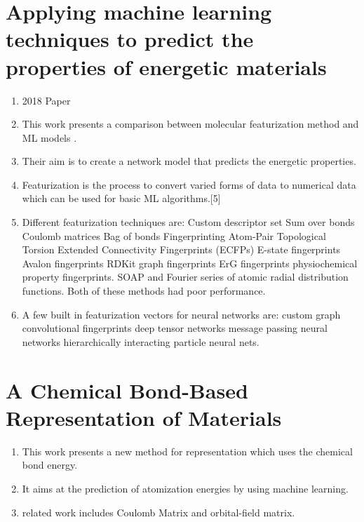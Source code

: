 \documentclass[]{report}
\begin{document}
\section{Applying machine learning
techniques to predict the properties
of energetic materials}
\begin{enumerate}
    \item 2018 Paper
    \item This work presents a comparison between molecular featurization method and ML models . 
    \item Their aim is to create a network model that predicts the energetic properties.
    \item Featurization is the process to convert varied forms of data to numerical data which can be used for basic ML algorithms.[5]
    \item Different featurization techniques are:
    \subitem Custom descriptor set
    \subitem Sum over bonds
    \subitem Coulomb matrices
    \subitem Bag of bonds
    \subitem Fingerprinting
    \subitem Atom-Pair
    \subitem Topological Torsion
    \subitem Extended Connectivity Fingerprints (ECFPs)
    \subitem E-state fingerprints
    \subitem Avalon fingerprints
    \subitem RDKit graph fingerprints
    \subitem ErG fingerprints
    \subitem physiochemical property
    \subitem 
fingerprints.
    \subitem SOAP and Fourier series of atomic radial distribution functions. Both of these methods had poor performance.
    \item A few built in featurization vectors for neural networks are:
    \subitem custom graph convolutional fingerprints
    \subitem deep tensor networks
     message
passing neural networks
    \subitem hierarchically interacting particle neural nets.
    \subitem

\end{enumerate}

	
\section{A Chemical Bond-Based Representation of Materials}
\begin{enumerate}
    \item This work presents a new method for representation which uses the chemical bond energy. 
    \item It aims at the prediction of atomization energies by using machine learning. 
    \item related work includes Coulomb Matrix and orbital-ﬁeld matrix.
\end{enumerate}
\end{document}

